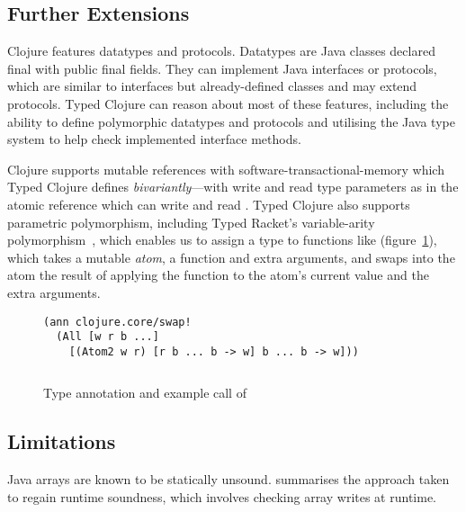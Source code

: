 \subsection{Further Extensions}

Clojure features datatypes and protocols. Datatypes are Java classes
declared final with public final fields. They can implement Java interfaces
or protocols, which are similar to interfaces but already-defined classes
and \nil{} may extend protocols.
%
Typed Clojure can reason about most of these features,
including the ability to define polymorphic datatypes and protocols and
utilising the Java type system to help check implemented interface methods.

%
%
Clojure supports mutable references with software-transactional-memory
which Typed Clojure defines \emph{bivariantly}---with write and read type parameters
as in the atomic reference  which can write and read .
Typed Clojure also supports parametric polymorphism, including
Typed Racket's variable-arity polymorphism~\cite{stf-esop}, 
which enables us to assign a type to functions like  (figure~\ref{main:fig:swap!}),
which takes a mutable \emph{atom},
a function and extra arguments, and swaps into the atom the result of
applying the function to the atom's current value and the extra arguments.

\begin{figure}
\begin{verbatim}
(ann clojure.core/swap! 
  (All [w r b ...] 
    [(Atom2 w r) [r b ... b -> w] b ... b -> w]))

\end{verbatim}
\inputminted[firstline=5,lastline=5]{clojure}{code/demo/src/demo/atom.clj}
\caption{Type annotation and example call of }
\label{main:fig:swap!}
\end{figure}

\subsection{Limitations}
Java arrays are known to be statically unsound. \citet{Bra98} 
summarises the approach taken to regain runtime soundness, which involves
checking array writes at runtime.

